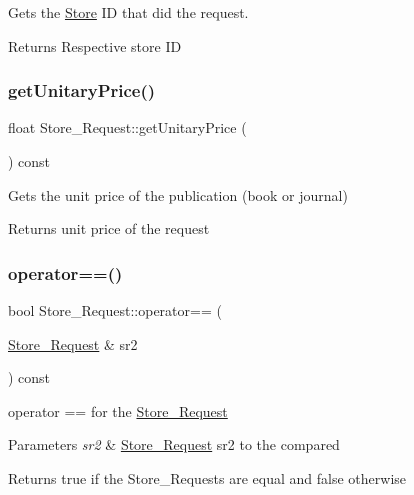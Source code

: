 Gets the \hyperlink{class_store}{Store} ID that did the request. 

\begin{DoxyReturn}{Returns}
Respective store ID 
\end{DoxyReturn}
\mbox{\label{class_store___request_a93fc46718e228136422fd03dd36032aa}} 
\subsubsection{\texorpdfstring{get\+Unitary\+Price()}{getUnitaryPrice()}}
{\footnotesize\ttfamily float Store\+\_\+\+Request\+::get\+Unitary\+Price (\begin{DoxyParamCaption}{ }\end{DoxyParamCaption}) const}



Gets the unit price of the publication (book or journal) 

\begin{DoxyReturn}{Returns}
unit price of the request 
\end{DoxyReturn}
\mbox{\label{class_store___request_acaf1134a64475cff2641234e32b0b263}} 
\subsubsection{\texorpdfstring{operator==()}{operator==()}}
{\footnotesize\ttfamily bool Store\+\_\+\+Request\+::operator== (\begin{DoxyParamCaption}\item[{\hyperlink{class_store___request}{Store\+\_\+\+Request} \&}]{sr2 }\end{DoxyParamCaption}) const}



operator == for the \hyperlink{class_store___request}{Store\+\_\+\+Request} 


\begin{DoxyParams}{Parameters}
{\em sr2} & \hyperlink{class_store___request}{Store\+\_\+\+Request} sr2 to the compared\\
\hline
\end{DoxyParams}
\begin{DoxyReturn}{Returns}
true if the Store\+\_\+\+Requests are equal and false otherwise 
\end{DoxyReturn}
\mbox{\label{class_store___request_a1827180c3d971d1e6a4e6bfc85641019}} 
